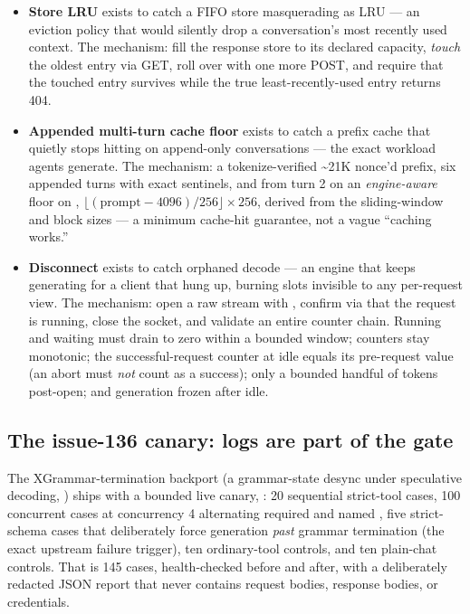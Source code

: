 \begin{itemize}
\item \textbf{Store LRU} exists to catch a FIFO store masquerading as LRU
  --- an eviction policy that would silently drop a conversation's most
  recently used context. The mechanism: fill the response store to its
  declared capacity, \emph{touch} the oldest entry via GET, roll over with
  one more POST, and require that the touched entry survives while the
  true least-recently-used entry returns 404.
\item \textbf{Appended multi-turn cache floor} exists to catch a prefix
  cache that quietly stops hitting on append-only conversations --- the
  exact workload agents generate. The mechanism: a tokenize-verified
  \textasciitilde{}21K nonce'd prefix, six appended turns with exact
  sentinels, and from turn 2 on an \emph{engine-aware} floor on
  ,
  $\lfloor(\text{prompt}-4096)/256\rfloor \times 256$, derived from the
  sliding-window and block sizes --- a minimum cache-hit guarantee, not a
  vague ``caching works.''
\item \textbf{Disconnect} exists to catch orphaned decode --- an engine
  that keeps generating for a client that hung up, burning slots invisible
  to any per-request view. The mechanism: open a raw stream with
  , confirm via  that the request is
  running, close the socket, and validate an entire counter chain.
  Running and waiting must drain to zero within a bounded window; counters
  stay monotonic; the successful-request counter at idle equals its
  pre-request value (an abort must \emph{not} count as a success); only a
  bounded handful of tokens post-open; and generation frozen after idle.
\end{itemize}

\subsection{The issue-136 canary: logs are part of the gate}

The  XGrammar-termination backport (a grammar-state desync
under speculative decoding, ) ships with a bounded live
canary, : 20 sequential
strict-tool cases, 100 concurrent cases at concurrency 4 alternating
required and named , five  strict-schema
cases that deliberately force generation \emph{past} grammar termination
(the exact upstream failure trigger), ten ordinary-tool controls, and ten
plain-chat controls. That is 145 cases, health-checked before and after,
with a deliberately redacted JSON report that never contains request
bodies, response bodies, or credentials.

